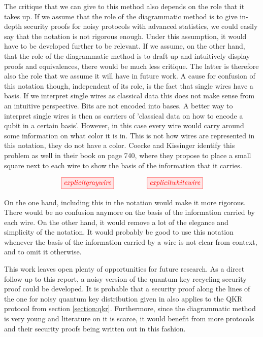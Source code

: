 \documentclass[]{article}
\begin{document}
The critique that we can give to this method also depends on the role that it takes up. If we assume that the role of the diagrammatic method is to give in-depth security proofs for noisy protocols with advanced statistics, we could easily say that the notation is not rigorous enough. Under this assumption, it would have to be developed further to be relevant. If we assume, on the other hand, that the role of the diagrammatic method is to draft up and intuitively display proofs and equivalences, there would be much less critique. The latter is therefore also the role that we assume it will have in future work. A cause for confusion of this notation though, independent of its role, is the fact that single wires have a basis. If we interpret single wires as classical data this does not make sense from an intuitive perspective. Bits are not encoded into bases. A better way to interpret single wires is then as carriers of 'classical data on how to encode a qubit in a certain basis'. However, in this case every wire would carry around some information on what color it is in. This is not how wires are represented in this notation, they do not have a color. Coecke and Kissinger identify this problem as well in their book \cite{Coecke2017} on page 740, where they propose to place a small square next to each wire to show the basis of the information that it carries. 

\begin{equation}
	\tikzfig{explicitgraywire} ~~~~~~~~~~~~~~ \tikzfig{explicitwhitewire}
\end{equation}

On the one hand, including this in the notation would make it more rigorous. There would be no confusion anymore on the basis of the information carried by each wire. On the other hand, it would remove a lot of the elegance and simplicity of the notation. It would probably be good to use this notation whenever the basis of the information carried by a wire is not clear from context, and to omit it otherwise.

This work leaves open plenty of opportunities for future research. As a direct follow up to this report, a noisy version of the quantum key recycling security proof could be developed. It is probable that a security proof along the lines of the one for noisy quantum key distribution given in \cite{Kissinger2017} also applies to the QKR protocol from section \ref{section:qkr}. Furthermore, since the diagrammatic method is very young and literature on it is scarce, it would benefit from more protocols and their security proofs being written out in this fashion.
\end{document}
